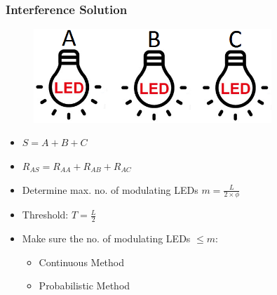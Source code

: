\documentclass{beamer}
\begin{document}
	\begin{frame}\frametitle{Interference Solution}

		\begin{minipage}{.5\linewidth}
			\begin{figure}
				\centering
				\includegraphics[width=0.8\textwidth]{correlation-leds.png}
			\end{figure}
		\end{minipage}%
		\begin{minipage}{.5\linewidth}
			\begin{itemize}
				\item $S = A + B + C$

				\item $R_{AS} = R_{AA} + R_{AB} + R_{AC}$

			\end{itemize}
		\end{minipage}
		\vspace{10mm}
		\begin{itemize}
			\item Determine max. no. of modulating LEDs $m = \frac{L}{2 \times \phi}$
			\item Threshold: $T = \frac{L}{2}$ %
			\item Make sure the no. of modulating LEDs $\le m$:
				\begin{itemize}
					\item Continuous Method
					\item Probabilistic Method
				\end{itemize}
		\end{itemize}




\end{frame}
\end{document}
